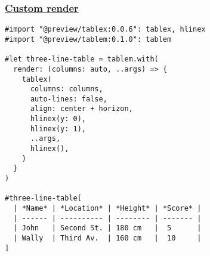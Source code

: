 \pandocbounded{}

\subsubsection{\texorpdfstring{\hyperref[custom-render]{Custom
render}}{Custom render}}\label{custom-render}

\begin{verbatim}
#import "@preview/tablex:0.0.6": tablex, hlinex
#import "@preview/tablem:0.1.0": tablem

#let three-line-table = tablem.with(
  render: (columns: auto, ..args) => {
    tablex(
      columns: columns,
      auto-lines: false,
      align: center + horizon,
      hlinex(y: 0),
      hlinex(y: 1),
      ..args,
      hlinex(),
    )
  }
)

#three-line-table[
  | *Name* | *Location* | *Height* | *Score* |
  | ------ | ---------- | -------- | ------- |
  | John   | Second St. | 180 cm   |  5      |
  | Wally  | Third Av.  | 160 cm   |  10     |
]
\end{verbatim}

\pandocbounded{}
